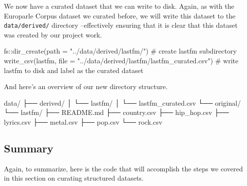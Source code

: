 \documentclass[
  letterpaper,
]{latex/krantz}
\newenvironment{Shaded}{\begin{snugshade}}{\end{snugshade}}
\newcommand{\AttributeTok}[1]{\textcolor[rgb]{0.40,0.45,0.13}{#1}}
\newcommand{\CommentTok}[1]{\textcolor[rgb]{0.37,0.37,0.37}{#1}}
\newcommand{\ExtensionTok}[1]{\textcolor[rgb]{0.00,0.23,0.31}{#1}}
\newcommand{\FunctionTok}[1]{\textcolor[rgb]{0.28,0.35,0.67}{#1}}
\newcommand{\NormalTok}[1]{\textcolor[rgb]{0.00,0.23,0.31}{#1}}
\newcommand{\SpecialCharTok}[1]{\textcolor[rgb]{0.37,0.37,0.37}{#1}}
\newcommand{\StringTok}[1]{\textcolor[rgb]{0.13,0.47,0.30}{#1}}
\begin{document}
We now have a curated dataset that we can write to disk. Again, as with
the Europarle Corpus dataset we curated before, we will write this
dataset to the \texttt{data/derived/} directory --effectively ensuring
that it is clear that this dataset was created by our project work.

\begin{Shaded}
\begin{Highlighting}[]
\NormalTok{fs}\SpecialCharTok{::}\FunctionTok{dir\_create}\NormalTok{(}\AttributeTok{path =} \StringTok{"../data/derived/lastfm/"}\NormalTok{) }\CommentTok{\# create lastfm subdirectory}
\FunctionTok{write\_csv}\NormalTok{(lastfm, }
          \AttributeTok{file =} \StringTok{"../data/derived/lastfm/lastfm\_curated.csv"}\NormalTok{) }\CommentTok{\# write lastfm to disk and label as the curated dataset}
\end{Highlighting}
\end{Shaded}

And here's an overview of our new directory structure.

\begin{Shaded}
\begin{Highlighting}[]
\ExtensionTok{data/}
\ExtensionTok{├──}\NormalTok{ derived/}
\ExtensionTok{│}\NormalTok{   └── lastfm/}
\ExtensionTok{│}\NormalTok{       └── lastfm\_curated.csv}
\ExtensionTok{└──}\NormalTok{ original/}
    \ExtensionTok{└──}\NormalTok{ lastfm/}
        \ExtensionTok{├──}\NormalTok{ README.md}
        \ExtensionTok{├──}\NormalTok{ country.csv}
        \ExtensionTok{├──}\NormalTok{ hip\_hop.csv}
        \ExtensionTok{├──}\NormalTok{ lyrics.csv}
        \ExtensionTok{├──}\NormalTok{ metal.csv}
        \ExtensionTok{├──}\NormalTok{ pop.csv}
        \ExtensionTok{└──}\NormalTok{ rock.csv}
\end{Highlighting}
\end{Shaded}

\hypertarget{summary-7}{%
\subsection{Summary}\label{summary-7}}

Again, to summarize, here is the code that will accomplish the steps we
covered in this section on curating structured datasets.
\end{document}
